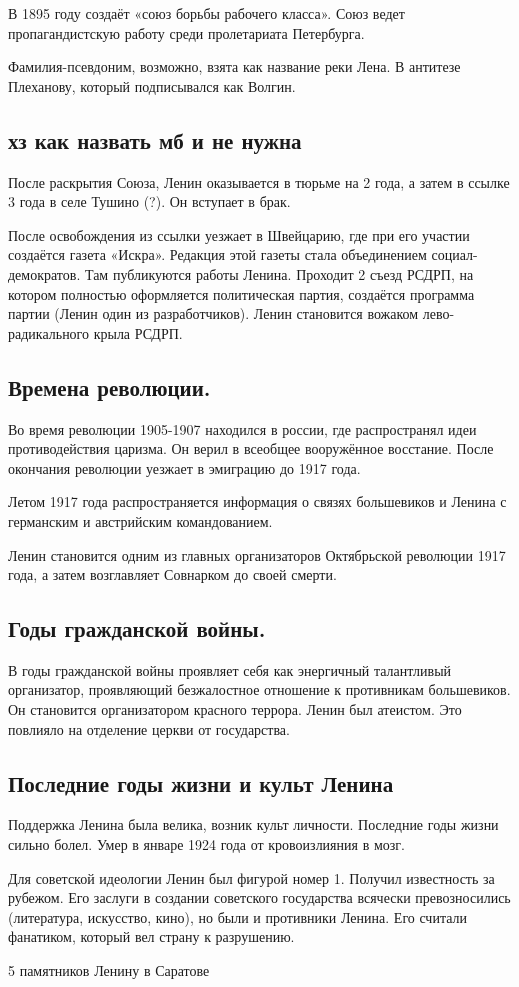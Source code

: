 В 1895 году создаёт «союз борьбы рабочего класса». Союз ведет пропагандистскую работу среди пролетариата Петербурга. 

Фамилия-псевдоним, возможно, взята как название реки Лена. В антитезе Плеханову, который подписывался как Волгин.

\subsection{хз как назвать мб и не нужна}

После раскрытия Союза, Ленин оказывается в тюрьме на 2 года, а затем в ссылке 3 года в селе Тушино (?). Он вступает в брак.

После освобождения из ссылки уезжает в Швейцарию, где при его участии создаётся газета «Искра». Редакция этой газеты стала объединением социал-демократов. Там публикуются работы Ленина. Проходит 2 съезд РСДРП, на котором полностью оформляется политическая партия, создаётся программа партии (Ленин один из разработчиков). Ленин становится вожаком лево-радикального крыла РСДРП.

\subsection{Времена революции.}

Во время революции 1905-1907 находился в россии, где распространял идеи противодействия царизма. Он верил в всеобщее вооружённое восстание. После окончания революции уезжает в эмиграцию до 1917 года.

Летом 1917 года распространяется информация о связях большевиков и Ленина с германским и австрийским командованием.

Ленин становится одним из главных организаторов Октябрьской революции 1917 года, а затем возглавляет Совнарком до своей смерти.

\subsection{Годы гражданской войны.}

В годы гражданской войны проявляет себя как энергичный талантливый организатор, проявляющий безжалостное отношение к противникам большевиков. Он становится организатором красного террора. Ленин был атеистом. Это повлияло на отделение церкви от государства.

\subsection{Последние годы жизни и культ Ленина}

Поддержка Ленина была велика, возник культ личности.
Последние годы жизни сильно болел. Умер в январе 1924 года от кровоизлияния в мозг.

Для советской идеологии Ленин был фигурой номер 1. Получил известность за рубежом. Его заслуги в создании советского государства всячески превозносились (литература, искусство, кино), но были и противники Ленина. Его считали фанатиком, который вел страну к разрушению.

5 памятников Ленину в Саратове